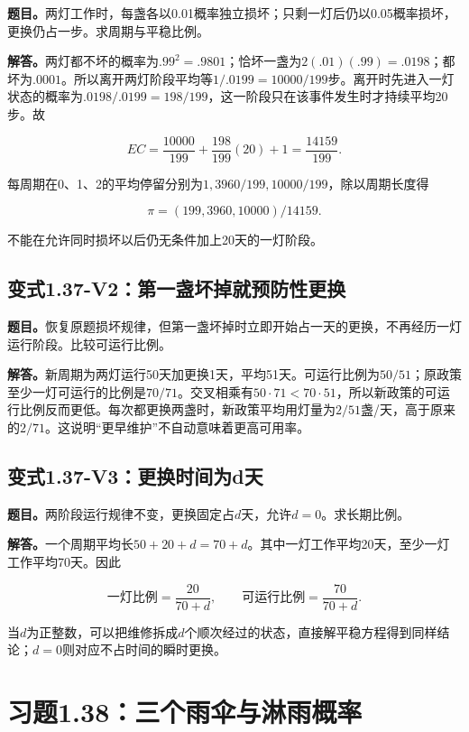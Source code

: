 \documentclass[
  11pt,
  a4paper,
  UTF8,
  fontset=fandol]{ctexart}
\begin{document}
\textbf{题目。}两灯工作时，每盏各以0.01概率独立损坏；只剩一灯后仍以0.05概率损坏，更换仍占一步。求周期与平稳比例。

\textbf{解答。}两灯都不坏的概率为\(.99^2=.9801\)；恰坏一盏为\(2(.01)(.99)=.0198\)；都坏为\(.0001\)。所以离开两灯阶段平均等\(1/.0199=10000/199\)步。离开时先进入一灯状态的概率为\(.0198/.0199=198/199\)，这一阶段只在该事件发生时才持续平均20步。故

\[
E C=\frac{10000}{199}+\frac{198}{199}(20)+1=\frac{14159}{199}.
\]

每周期在0、1、2的平均停留分别为\(1,3960/199,10000/199\)，除以周期长度得

\[
\boxed{\pi=(199,3960,10000)/14159.}
\]

不能在允许同时损坏以后仍无条件加上20天的一灯阶段。

\subsection{变式1.37-V2：第一盏坏掉就预防性更换}\label{ux53d8ux5f0f1.37-v2ux7b2cux4e00ux76cfux574fux6389ux5c31ux9884ux9632ux6027ux66f4ux6362}

\textbf{题目。}恢复原题损坏规律，但第一盏坏掉时立即开始占一天的更换，不再经历一灯运行阶段。比较可运行比例。

\textbf{解答。}新周期为两灯运行50天加更换1天，平均51天。可运行比例为\(50/51\)；原政策至少一灯可运行的比例是\(70/71\)。交叉相乘有\(50\cdot71<70\cdot51\)，所以新政策的可运行比例反而更低。每次都更换两盏时，新政策平均用灯量为\(2/51\)盏/天，高于原来的\(2/71\)。这说明``更早维护''不自动意味着更高可用率。

\subsection{变式1.37-V3：更换时间为d天}\label{ux53d8ux5f0f1.37-v3ux66f4ux6362ux65f6ux95f4ux4e3adux5929}

\textbf{题目。}两阶段运行规律不变，更换固定占\(d\)天，允许\(d=0\)。求长期比例。

\textbf{解答。}一个周期平均长\(50+20+d=70+d\)。其中一灯工作平均20天，至少一灯工作平均70天。因此

\[
\boxed{\text{一灯比例}=\frac{20}{70+d},\qquad
\text{可运行比例}=\frac{70}{70+d}.}
\]

当\(d\)为正整数，可以把维修拆成\(d\)个顺次经过的状态，直接解平稳方程得到同样结论；\(d=0\)则对应不占时间的瞬时更换。

\section{习题1.38：三个雨伞与淋雨概率}\label{ux4e60ux98981.38ux4e09ux4e2aux96e8ux4f1eux4e0eux6dcbux96e8ux6982ux7387}
\end{document}
